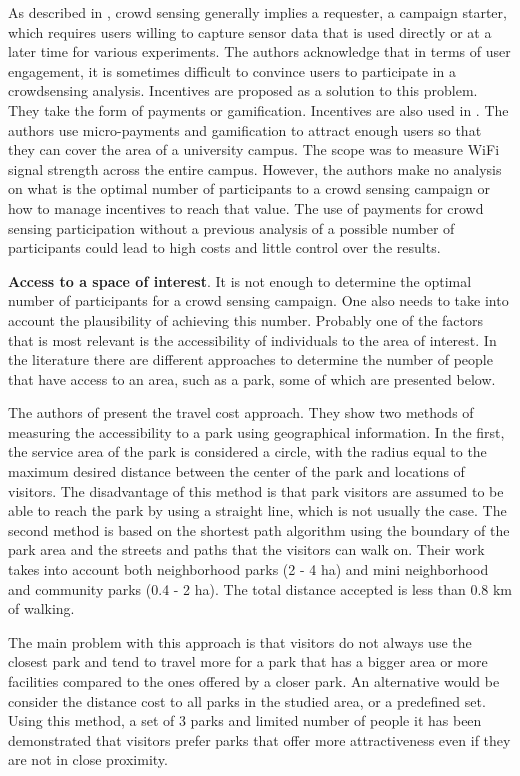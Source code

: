 As described in \cite{ra2012medusa}, crowd sensing generally implies a requester, a campaign starter, which requires users willing to capture sensor data that is used directly or at a later time for various experiments. The authors acknowledge that in terms of user engagement, it is sometimes difficult to convince users to participate in a crowdsensing analysis. Incentives are proposed as a solution to this problem. They take the form of payments or gamification. Incentives are also used in \cite{talasila2014crowdsensing}. The authors use micro-payments and gamification to attract enough users so that they can cover the area of a university campus. The scope was to measure WiFi signal strength across the entire campus. However, the authors make no analysis on what is the optimal number of participants to a crowd sensing campaign or how to manage incentives to reach that value. The use of payments for crowd sensing participation without a previous analysis of a possible number of participants could lead to high costs and little control over the results.

\textbf{Access to a space of interest}.
It is not enough to determine the optimal number of participants for a crowd sensing campaign. One also needs to take into account the plausibility of achieving this number. Probably one of the factors that is most relevant is the accessibility of individuals to the area of interest. In the literature there are different approaches to determine the number of people that have access to an area, such as a park, some of which are presented below.

The authors of \cite{nicholls2001measuring} present the travel cost approach. They show two methods of measuring the accessibility to a park using geographical information. In the first, the service area of the park is considered a circle, with the radius equal to the maximum desired distance between the center of the park and locations of visitors. The disadvantage of this method is that park visitors are assumed to be able to reach the park by using a straight line, which is not usually the case. The second method is based on the shortest path algorithm using the boundary of the park area and the streets and paths that the visitors can walk on. Their work takes into account both neighborhood parks (2 - 4 ha) and mini neighborhood and community parks (0.4 - 2 ha). The total distance accepted is less than 0.8 km of walking.

The main problem with this approach is that visitors do not always use the closest park and tend to travel more for a park that has a bigger area or more facilities compared to the ones offered by a closer park. An alternative would be consider the distance cost to all parks in the studied area, or a predefined set. Using this method, a set of 3 parks and limited number of people it has been demonstrated \cite{iamtrakul2005public} that visitors prefer parks that offer more attractiveness even if they are not in close proximity.

